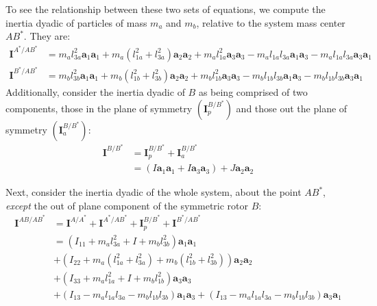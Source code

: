 \documentclass[letterpaper,11pt]{article}
\newcommand{\bs}[1]{ \boldsymbol{ #1 } }
\begin{document}
To see the relationship between these two sets of equations, we compute the
inertia dyadic of particles of mass $m_a$ and $m_b$, relative to the system
mass center $AB^*$.  They are:
\begin{align*}
  \bs{I}^{A^* / AB^*} & = 
  m_al_{3a}^2\bs{a}_1\bs{a}_1 + m_a(l_{1a}^2 + l_{3a}^2)\bs{a}_2 \bs{a}_2 +
  m_al_{1a}^2\bs{a}_3\bs{a}_3 - 
  m_al_{1a}l_{3a}\bs{a}_1\bs{a}_3 - m_al_{1a}l_{3a}\bs{a}_3\bs{a}_1 \\
  \bs{I}^{B^* / AB^*} & = 
  m_bl_{3b}^2\bs{a}_1\bs{a}_1 + m_b(l_{1b}^2 + l_{3b}^2)\bs{a}_2 \bs{a}_2 +
  m_bl_{1b}^2\bs{a}_3\bs{a}_3 - 
  m_bl_{1b}l_{3b}\bs{a}_1\bs{a}_3 - m_bl_{1b}l_{3b}\bs{a}_3\bs{a}_1
\end{align*}
Additionally, consider the inertia dyadic of $B$ as being comprised of two
components, those in the plane of symmetry $(\bs{I}^{B/B^*}_p)$ and those out
the plane of symmetry $(\bs{I}^{B/B^*}_a)$:
\begin{align*}
  \bs{I}^{B/B^*} & = \bs{I}^{B/B^*}_p + \bs{I}^{B/B^*}_a \\
  & = (I\bs{a}_1\bs{a}_1 + I\bs{a}_3\bs{a}_3) + J\bs{a}_2\bs{a}_2
\end{align*}

Next, consider the inertia dyadic of the whole system, about the point $AB^*$,
{\it{except}} the out of plane component of the symmetric rotor $B$:
\begin{align*}
  \bs{I}^{AB/AB^*} & = \bs{I}^{A/A^*} + \bs{I}^{A^*/AB^*} + \bs{I}^{B/B^*}_p +
  \bs{I}^{B^*/AB^*} \\
  & = (I_{11} + m_a l_{3a}^2 + I + m_b l_{3b}^2) \bs{a}_1\bs{a}_1 \\
  &
  +
  (I_{22} + m_a(l_{1a}^2 + l_{3a}^2) + m_b(l_{1b}^2 + l_{3b}^2))\bs{a}_2\bs{a}_2
  \\
  &
  + (I_{33} + m_al_{1a}^2 + I + m_b l_{1b}^2) \bs{a}_3\bs{a}_3
  \\
  &
  +
  (I_{13} - m_a l_{1a}l_{3a} - m_b l_{1b}l_{3b}) \bs{a}_1\bs{a}_3
  + 
  (I_{13} - m_a l_{1a}l_{3a} - m_b l_{1b}l_{3b}) \bs{a}_3\bs{a}_1
\end{align*}
\end{document}
